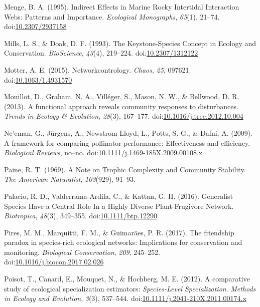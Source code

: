 \documentclass[a4paper]{artikel1}
\theoremstyle{definition}
\theoremstyle{definition}
\theoremstyle{definition}
\theoremstyle{remark}
\begin{document}
\hypertarget{ref-menge_indirect_1995}{}
Menge, B. A. (1995). Indirect Effects in Marine Rocky Intertidal
Interaction Webs: Patterns and Importance. \emph{Ecological Monographs},
\emph{65}(1), 21--74.
doi:\href{https://doi.org/10.2307/2937158}{10.2307/2937158}

\hypertarget{ref-mills_keystone-species_1993}{}
Mills, L. S., \& Doak, D. F. (1993). The Keystone-Species Concept in
Ecology and Conservation. \emph{BioScience}, \emph{43}(4), 219--224.
doi:\href{https://doi.org/10.2307/1312122}{10.2307/1312122}

\hypertarget{ref-motter_networkcontrology_2015}{}
Motter, A. E. (2015). Networkcontrology. \emph{Chaos}, \emph{25},
097621. doi:\href{https://doi.org/10.1063/1.4931570}{10.1063/1.4931570}

\hypertarget{ref-mouillot_functional_2013}{}
Mouillot, D., Graham, N. A., Villéger, S., Mason, N. W., \& Bellwood, D.
R. (2013). A functional approach reveals community responses to
disturbances. \emph{Trends in Ecology \& Evolution}, \emph{28}(3),
167--177.
doi:\href{https://doi.org/10.1016/j.tree.2012.10.004}{10.1016/j.tree.2012.10.004}

\hypertarget{ref-neeman_framework_2009}{}
Ne'eman, G., Jürgens, A., Newstrom-Lloyd, L., Potts, S. G., \& Dafni, A.
(2009). A framework for comparing pollinator performance: Effectiveness
and efficiency. \emph{Biological Reviews}, no--no.
doi:\href{https://doi.org/10.1111/j.1469-185X.2009.00108.x}{10.1111/j.1469-185X.2009.00108.x}

\hypertarget{ref-paine_note_1969}{}
Paine, R. T. (1969). A Note on Trophic Complexity and Community
Stability. \emph{The American Naturalist}, \emph{103}(929), 91--93.

\hypertarget{ref-palacio_generalist_2016}{}
Palacio, R. D., Valderrama-Ardila, C., \& Kattan, G. H. (2016).
Generalist Species Have a Central Role In a Highly Diverse
Plant-Frugivore Network. \emph{Biotropica}, \emph{48}(3), 349--355.
doi:\href{https://doi.org/10.1111/btp.12290}{10.1111/btp.12290}

\hypertarget{ref-pires_friendship_2017}{}
Pires, M. M., Marquitti, F. M., \& Guimarães, P. R. (2017). The
friendship paradox in species-rich ecological networks: Implications for
conservation and monitoring. \emph{Biological Conservation}, \emph{209},
245--252.
doi:\href{https://doi.org/10.1016/j.biocon.2017.02.026}{10.1016/j.biocon.2017.02.026}

\hypertarget{ref-poisot_comparative_2012}{}
Poisot, T., Canard, E., Mouquet, N., \& Hochberg, M. E. (2012). A
comparative study of ecological specialization estimators:
\emph{Species}\emph{-Level Specialization}. \emph{Methods in Ecology and
Evolution}, \emph{3}(3), 537--544.
doi:\href{https://doi.org/10.1111/j.2041-210X.2011.00174.x}{10.1111/j.2041-210X.2011.00174.x}
\end{document}
